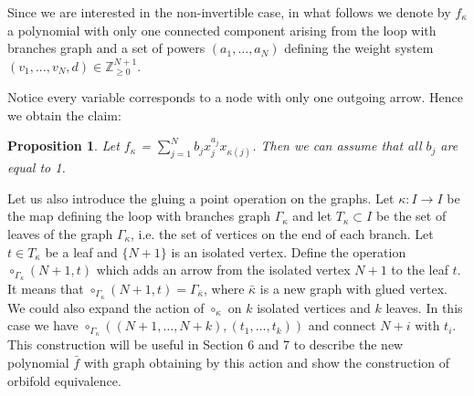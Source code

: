 \documentclass[reqno,12pt]{amsart}
\numberwithin{equation}{section}
\theoremstyle{plain}
\newtheorem{proposition}[theorem]{Proposition}
\theoremstyle{definition}
\newcommand{\ZZ}{{\mathbb{Z}}}
\begin{document}
Since we are interested in the non-invertible case, in what follows we denote by $f_\kappa$ a polynomial with only one connected component arising from the loop with branches graph and a set of powers $(a_1,\dots, a_N)$ defining the weight system $(v_1,...,v_N,d)\in\ZZ_{\geq 0}^{N+1}$. 

Notice every variable corresponds to a node with only one outgoing
arrow. Hence we obtain the claim:
\begin{proposition}{\label{scaling}}
    Let $f_\kappa$ = $\sum_{j=1}^{N}b_jx_j^{a_j}x_{\kappa(j)}$. Then we can assume that all $b_j$ are equal to 1.
\end{proposition}

Let us also introduce the gluing a point operation on the graphs. Let $\kappa\colon I \to I$ be the map defining the loop with branches graph $\Gamma_\kappa$ and let $T_\kappa \subset I$ be the set of leaves of the graph $\Gamma_\kappa$, i.e. the set of vertices on
the end of each branch. Let $t \in T_\kappa$ be a leaf and $\{N+1\}$ is an isolated vertex. Define the operation $\circ_{\Gamma_\kappa}(N+1, t)$ which adds an arrow from the isolated vertex $N+1$ to the leaf $t$. It means that $\circ_{\Gamma_\kappa}(N+1, t) = \Gamma_{\bar{\kappa}}$, where $\bar{\kappa}$ is a new graph with glued vertex. We could also expand the action of $\circ_{\kappa}$ on $k$ isolated vertices and $k$ leaves. In this case we have $\circ_{\Gamma_\kappa}((N+1, \dots, N+k), (t_1, \dots, t_k))$ and connect $N+i$ with $t_i$. This construction will be useful in Section 6 and 7 to describe the new polynomial $\bar{f}$ with graph obtaining by this action and show the construction of orbifold equivalence.
\end{document}
